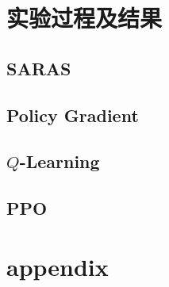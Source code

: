 \documentclass[citestyle=gb7714-2015, bibstyle=gb7714-2015,lang=cn,14pt,scheme=chinese]{elegantbook}
\begin{document}
\chapter{实验过程及结果}

\section{SARAS}

\section{Policy Gradient}

\section{\(Q\)-Learning}

\section{PPO}



\nocite{*}

\printbibliography[heading=bibintoc, title=\ebibname]
\appendix

\chapter{appendix}
\end{document}
